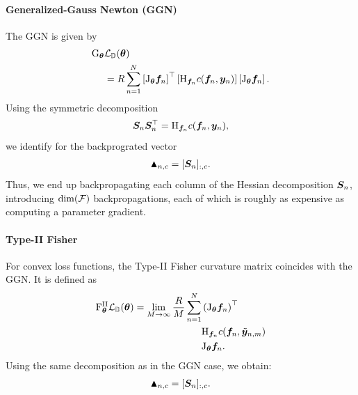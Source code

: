 \paragraph{Generalized-Gauss Newton (GGN)}
The GGN is given by\begin{align*}
\mathrm{G}_{{\bm{\theta}}}&{\mathcal{L}}_{{\mathbb{D}}}({\bm{\theta}}) \\
&= R \sum_{n=1}^N
  \left[\mathrm{J}_{{\bm{\theta}}} {\bm{f}}_n\right]^{\top}
  \left[\mathrm{H}_{{\bm{f}}_n} c({\bm{f}}_n, {\bm{y}}_n)
  \right]
  \left[\mathrm{J}_{{\bm{\theta}}} {\bm{f}}_n\right].
\end{align*}
Using the symmetric decomposition
$${\bm{S}}_n {\bm{S}}_n^{\top} = \mathrm{H}_{{\bm{f}}_n} c({\bm{f}}_n, {\bm{y}}_n),$$ we identify for the backprograted vector
\begin{align*}
  \blacktriangle_{n,c} = [{\bm{S}}_n]_{:,c}.
\end{align*}
Thus, we end up backpropagating each column of the Hessian decomposition ${\bm{S}}_n$, introducing $\dim({\mathcal{F}})$ backpropagations, each of which is roughly as expensive as computing a parameter gradient.

\paragraph{Type-II Fisher}
For convex loss functions, the Type-II Fisher curvature matrix coincides with the GGN. It is defined as
\begin{align*}
\mathrm{F}^{\text{II}}_{{\bm{\theta}}} {\mathcal{L}}_{{\mathbb{D}}}({\bm{\theta}}) = \lim_{M \to \infty} \frac{R}{M} \sum_{n=1}^N & \left(\mathrm{J}_{{\bm{\theta}}} {\bm{f}}_n\right)^{\top} \\
&\mathrm{H}_{{\bm{f}}_n} c({\bm{f}}_n, \tilde{{\bm{y}}}_{n,m}) \\
&\mathrm{J}_{{\bm{\theta}}} {\bm{f}}_n.
\end{align*}
Using the same decomposition as in the GGN case, we obtain:
\begin{align*}
  \blacktriangle_{n,c} = [{\bm{S}}_n]_{:,c}.
\end{align*}

